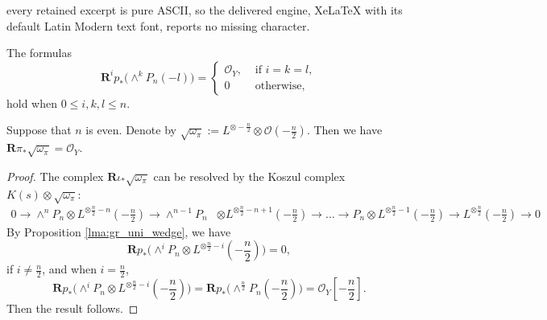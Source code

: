 \documentclass[10pt,a4paper]{amsart}
\newcommand{\SO}{\mathcal{O}}
\begin{document}
every retained excerpt is pure ASCII, so the delivered engine, XeLaTeX with its default Latin Modern text font, reports no missing character.
\begin{proposition}\label{lma:gr_uni_wedge}
    The formulas
    \[
        \mathbf{R}^{i}p_* \big(\wedge^{k}{P }_n(-l)\big) = \begin{cases}
            \SO_Y, & \text{ if } i=k=l, \\
            0      & \text{ otherwise,}
        \end{cases}
    \]
    hold when $0\leq i,k,l \leq n$.
\end{proposition}

\begin{lemma} \label{cor:push-pull-identiy-3}
    Suppose that $n$ is even. Denote by $\sqrt{\omega_\pi}:= L^{\otimes -\frac{n}{2}} \otimes \SO(-\frac{n}{2})$. Then we have $\mathbf{R}\pi_* \sqrt{\omega_\pi} = \SO_Y$.
\end{lemma}

\begin{proof} The complex $\mathbf{R}\iota_* \sqrt{\omega_\pi}$ can be resolved by the Koszul complex $K(s) \otimes\sqrt{\omega_\pi} $:
    \[
        \begin{aligned}
            0 \to \wedge^{n}{P }_n \otimes L^{\otimes \frac{n}{2}-n}(-\frac{n}{2})\to \wedge^{n-1}{P }_n & \otimes L^{\otimes \frac{n}{2}-n+1}(-\frac{n}{2}) \to \ldots \to {P }_n \otimes L^{\otimes \frac{n}{2}-1}(-\frac{n}{2}) \to { L^{\otimes \frac{n}{2}}(-\frac{n}{2})} \to 0
        \end{aligned}
    \]
    By Proposition \ref{lma:gr_uni_wedge}, we have
    \[
        \mathbf{R}p_*\big(\wedge^{i}{P }_n \otimes L^{\otimes \frac{n}{2}-i}(-\frac{n}{2})\big) = 0,
    \]
    if $i\neq \frac{n}{2}$, and when $i=\frac{n}{2}$,
    \[
        \mathbf{R}p_*\big(\wedge^{i}{P }_n \otimes L^{\otimes \frac{n}{2}-i}(-\frac{n}{2})\big) =\mathbf{R}p_*\big(\wedge^{\frac{n}{2}}{P }_n(-\frac{n}{2})\big) = \SO_{Y}[-\frac{n}{2}].
    \]
    Then the result follows.
\end{proof}
\end{document}
